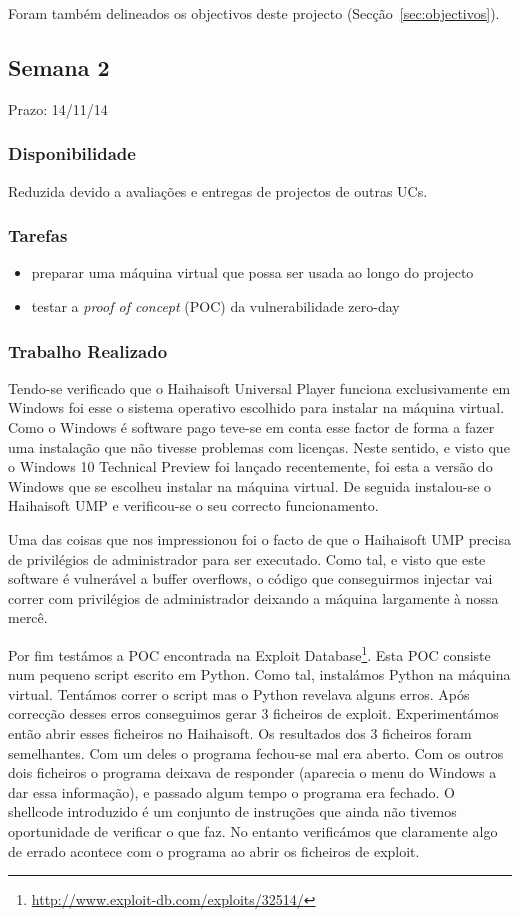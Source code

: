\documentclass[a4paper]{article}
\begin{document}
Foram também delineados os objectivos deste projecto (Secção~\ref{sec:objectivos}).

\subsection{Semana 2}
Prazo: 14/11/14
\subsubsection{Disponibilidade}
Reduzida devido a avaliações e entregas de projectos de outras UCs.

\subsubsection{Tarefas}
\begin{itemize}
\item preparar uma máquina virtual que possa ser usada ao longo do projecto
\item testar a \textit{proof of concept} (POC) da vulnerabilidade zero-day
\end{itemize}

\subsubsection{Trabalho Realizado}
Tendo-se verificado que o Haihaisoft Universal Player funciona exclusivamente em Windows foi esse o sistema operativo escolhido para instalar na máquina virtual. Como o Windows é software pago teve-se em conta esse factor de forma a fazer uma instalação que não tivesse problemas com licenças. Neste sentido, e visto que o Windows 10 Technical Preview foi lançado recentemente, foi esta a versão do Windows que se escolheu instalar na máquina virtual. De seguida instalou-se o Haihaisoft UMP e verificou-se o seu correcto funcionamento.

Uma das coisas que nos impressionou foi o facto de que o Haihaisoft UMP precisa de privilégios de administrador para ser executado. Como tal, e visto que este software é vulnerável a buffer overflows, o código que conseguirmos injectar vai correr com privilégios de administrador deixando a máquina largamente à nossa mercê.

Por fim testámos a POC encontrada na Exploit Database\footnote{\url{http://www.exploit-db.com/exploits/32514/}}. Esta POC consiste num pequeno script escrito em Python. Como tal, instalámos Python na máquina virtual. Tentámos correr o script mas o Python revelava alguns erros. Após correcção desses erros conseguimos gerar 3 ficheiros de exploit. Experimentámos então abrir esses ficheiros no Haihaisoft. Os resultados dos 3 ficheiros foram semelhantes. Com um deles o programa fechou-se mal era aberto. Com os outros dois ficheiros o programa deixava de responder (aparecia o menu do Windows a dar essa informação), e passado algum tempo o programa era fechado. O shellcode introduzido é um conjunto de instruções que ainda não tivemos oportunidade de verificar o que faz. No entanto verificámos que claramente algo de errado acontece com o programa ao abrir os ficheiros de exploit.
\end{document}
